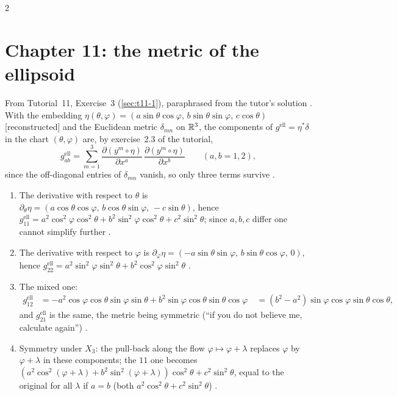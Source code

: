 \begin{paracol}{2}
\section*{Chapter 11: the metric of the ellipsoid}\label{app:c11-ellipsoid}

From Tutorial~11, Exercise~3 (\cref{sec:t11-1}), paraphrased from the tutor's solution . With the embedding $\eta(\theta,\varphi)=(a\sin\theta\cos\varphi,\,b\sin\theta\sin\varphi,\,c\cos\theta)$ [reconstructed] and the Euclidean metric $\delta_{mn}$ on $\mathbb{R}^3$, the components of $g^{\mathrm{ell}}=\eta^*\delta$ in the chart $(\theta,\varphi)$ are, by exercise~2.3 of the tutorial,
\[
  g^{\mathrm{ell}}_{ab}=\sum_{m=1}^3\frac{\partial(y^m\circ\eta)}{\partial x^a}\,\frac{\partial(y^m\circ\eta)}{\partial x^b}\qquad(a,b=1,2),
\]
since the off-diagonal entries of $\delta_{mn}$ vanish, so only three terms survive .
\begin{enumerate}
  \item The derivative with respect to $\theta$ is $\partial_\theta\eta=(a\cos\theta\cos\varphi,\,b\cos\theta\sin\varphi,\,-c\sin\theta)$, hence $g^{\mathrm{ell}}_{11}=a^2\cos^2\varphi\cos^2\theta+b^2\sin^2\varphi\cos^2\theta+c^2\sin^2\theta$; since $a,b,c$ differ one cannot simplify further .
  \item The derivative with respect to $\varphi$ is $\partial_\varphi\eta=(-a\sin\theta\sin\varphi,\,b\sin\theta\cos\varphi,\,0)$, hence $g^{\mathrm{ell}}_{22}=a^2\sin^2\varphi\sin^2\theta+b^2\cos^2\varphi\sin^2\theta$ .
  \item The mixed one:
        \begin{align*}
          g^{\mathrm{ell}}_{12}&=-a^2\cos\varphi\cos\theta\sin\varphi\sin\theta+b^2\sin\varphi\cos\theta\sin\theta\cos\varphi\
          &=(b^2-a^2)\sin\varphi\cos\varphi\sin\theta\cos\theta,
        \end{align*}
        and $g^{\mathrm{ell}}_{21}$ is the same, the metric being symmetric (``if you do not believe me, calculate again'') .
  \item Symmetry under $X_3$: the pull-back along the flow $\varphi\mapsto\varphi+\lambda$ replaces $\varphi$ by $\varphi+\lambda$ in these components; the $11$ one becomes $(a^2\cos^2(\varphi+\lambda)+b^2\sin^2(\varphi+\lambda))\cos^2\theta+c^2\sin^2\theta$, equal to the original for all $\lambda$ if $a=b$ (both $a^2\cos^2\theta+c^2\sin^2\theta$) .
\end{enumerate}

\flushside
\end{paracol}
